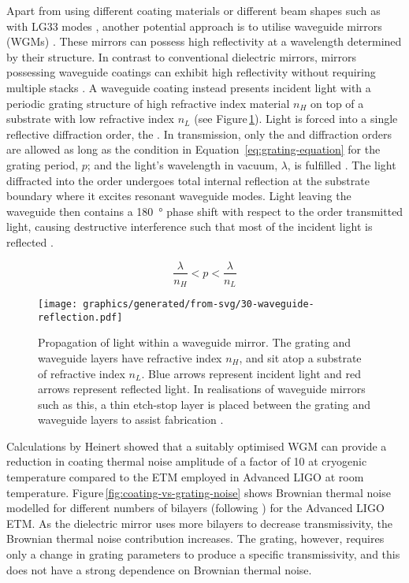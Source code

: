 Apart from using different coating materials \cite{Granata2013, Cole2013} or different beam shapes \cite{Mours2006, DAmbrosio2004, Bondarescu2006} such as with LG33 modes \cite{Sorazu2013}, another potential approach is to utilise waveguide mirrors (\glspl{WGM}) \cite{Brueckner2008, Brueckner2009, Brueckner2010, Friedrich2011}. These mirrors can possess high reflectivity at a wavelength determined by their structure. In contrast to conventional dielectric mirrors, mirrors possessing waveguide coatings can exhibit high reflectivity without requiring multiple stacks \cite{Bunkowski2006}. A waveguide coating instead presents incident light with a periodic grating structure of high refractive index material $n_H$ on top of a substrate with low refractive index $n_L$ (see Figure\,\ref{fig:waveguide-reflection}). Light is forced into a single reflective diffraction order, the . In transmission, only the  and  diffraction orders are allowed as long as the condition in Equation~\ref{eq:grating-equation} for the grating period, $p$; and the light's wavelength in vacuum, $\lambda$, is fulfilled \cite{Brueckner2008}. The light diffracted into the  order undergoes total internal reflection at the substrate boundary where it excites resonant waveguide modes. Light leaving the waveguide then contains a \SI{180}{\degree} phase shift with respect to the  order transmitted light, causing destructive interference such that most of the incident light is reflected \cite{Sharon1997}.

\begin{equation}
  \frac{\lambda}{n_{H}} < p < \frac{\lambda}{n_{L}}
  \label{eq:grating-equation}
\end{equation}

\begin{figure}
  \centering
  \texttt{[image: graphics/generated/from-svg/30-waveguide-reflection.pdf]}
  \caption{\label{fig:waveguide-reflection}Propagation of light within a waveguide mirror. The grating and waveguide layers have refractive index $n_H$, and sit atop a substrate of refractive index $n_L$. Blue arrows represent incident light and red arrows represent reflected light. In realisations of waveguide mirrors such as this, a thin etch-stop layer is placed between the grating and waveguide layers to assist fabrication \cite{Friedrich2011}.}
\end{figure}

Calculations by Heinert \etal{} \cite{Heinert2013} showed that a suitably optimised \gls{WGM} can provide a reduction in coating thermal noise amplitude of a factor of 10 at cryogenic temperature compared to the \gls{ETM} employed in Advanced LIGO at room temperature. Figure\,\ref{fig:coating-vs-grating-noise} shows Brownian thermal noise modelled for different numbers of bilayers (following \cite{Harry2002}) for the Advanced LIGO \gls{ETM}. As the dielectric mirror uses more bilayers to decrease transmissivity, the Brownian thermal noise contribution increases. The grating, however, requires only a change in grating parameters to produce a specific transmissivity, and this does not have a strong dependence on Brownian thermal noise.

